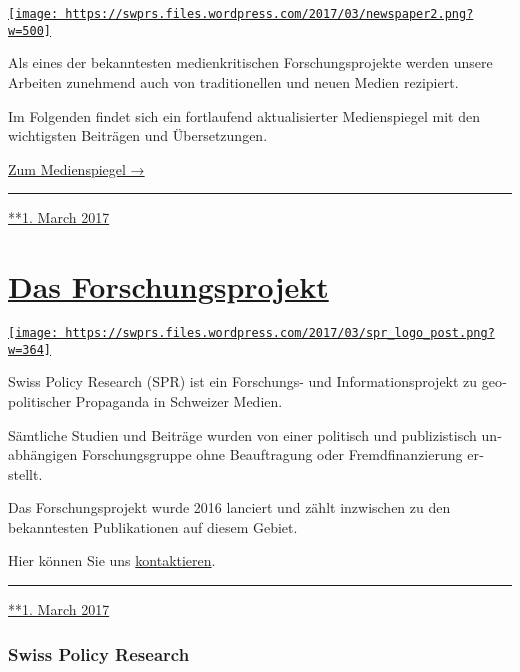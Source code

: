 \href{https://swprs.org/2017/03/01/medienspiegel/}{\texttt{[image: https://swprs.files.wordpress.com/2017/03/newspaper2.png?w=500]}}

Als eines der bekanntesten medien­kritischen Forschungs­projekte werden
unsere Arbeiten zunehmend auch von tradi­tio­nellen und neuen Medien
rezipiert.

Im Folgenden findet sich ein fort­laufend aktuali­sierter Medien­spiegel
mit den wich­tig­sten Beiträgen und Übersetzungen.

\href{https://swprs.org/medienspiegel/}{Zum Medienspiegel →}

\begin{center}\rule{0.5\linewidth}{\linethickness}\end{center}

\href{https://swprs.org/2017/03/01/medienspiegel/}{**1. March 2017}

\hypertarget{das-forschungsprojekt}{%
\section{\texorpdfstring{\href{https://swprs.org/2017/03/01/das-forschungsprojekt/}{Das
Forschungsprojekt}}{Das Forschungsprojekt}}\label{das-forschungsprojekt}}

\href{https://swprs.org/2017/03/01/das-forschungsprojekt/}{\texttt{[image: https://swprs.files.wordpress.com/2017/03/spr\_logo\_post.png?w=364]}}

Swiss Policy Research (SPR) ist ein Forschungs- und
Infor­ma­tions­projekt zu geo­po­li­tischer Pro­pa­ganda in Schweizer
Medien.

Sämtliche Studien und Bei­träge wurden von einer po­li­tisch und
pu­bli­zis­tisch un­ab­hän­gigen For­schungs­gruppe ohne Beauf­tra­gung
oder Fremd­finan­zierung er­­stellt.

Das Forschungsprojekt wurde 2016 lanciert und zählt inzwischen zu den
bekanntesten Publi­ka­tionen auf diesem Gebiet.

Hier können Sie uns \href{https://swprs.org/kontakt/}{kon­­tak­tieren}.

\begin{center}\rule{0.5\linewidth}{\linethickness}\end{center}

\href{https://swprs.org/2017/03/01/das-forschungsprojekt/}{**1. March
2017}

\hypertarget{swiss-policy-research}{%
\subsubsection{Swiss Policy Research}\label{swiss-policy-research}}


